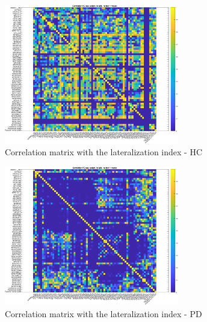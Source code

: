 \documentclass[]{article}
\begin{document}
\begin{figure}[h]
	\centering
	\includegraphics[width=3in]{../correlation_matrix_hc}
	\caption{Correlation matrix with the lateralization index - HC}
	\label{fig:corr_mat_hc}
	
\end{figure} 

\begin{figure}[h]
	\centering
	\includegraphics[width=3in]{../correlation_matrix_pd}
	\caption{Correlation matrix with the lateralization index - PD}
	\label{fig:corr_mat_pd}
	
\end{figure} 
\end{document}
